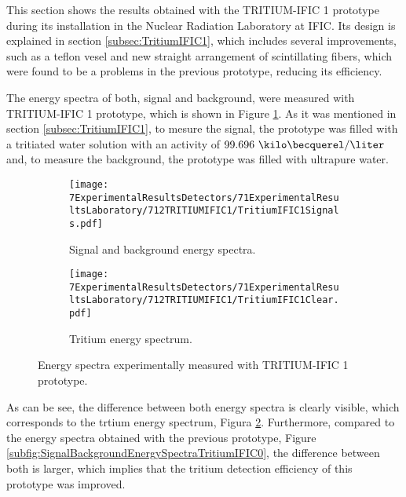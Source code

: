 This section shows the results obtained with the TRITIUM-IFIC 1 prototype  during its installation in the Nuclear Radiation Laboratory at IFIC. Its design is explained in section \ref{subsec:TritiumIFIC1}, which includes several improvements, such as a teflon vesel and new straight arrangement of scintillating fibers, which were found to be a problems in the previous prototype, reducing its efficiency.

The energy spectra of both, signal and background, were measured with TRITIUM-IFIC 1 prototype, which is shown in Figure \ref{subfig:SignalBackgroundEnergySpectraTritiumIFIC1}. As it was mentioned in section \ref{subsec:TritiumIFIC1}, to mesure the signal, the prototype was filled with a tritiated water solution with an activity of $99.696~\kilo\becquerel/\liter$ and, to measure the background, the prototype was filled with ultrapure water.

\begin{figure}
\centering
    \begin{subfigure}[b]{1\textwidth}
    \centering
    \texttt{[image: 7ExperimentalResultsDetectors/71ExperimentalResultsLaboratory/712TRITIUMIFIC1/TritiumIFIC1Signals.pdf]}  
    \caption{Signal and background energy spectra.\label{subfig:SignalBackgroundEnergySpectraTritiumIFIC1}}
    \end{subfigure}
    \hfill
    \begin{subfigure}[b]{1\textwidth}
    \centering
    \texttt{[image: 7ExperimentalResultsDetectors/71ExperimentalResultsLaboratory/712TRITIUMIFIC1/TritiumIFIC1Clear.pdf]}  
    \caption{Tritium energy spectrum.\label{subfig:TritiumEnergySpectraTritiumIFIC1}}
    \end{subfigure}
 \caption{Energy spectra experimentally measured with TRITIUM-IFIC 1 prototype.}
 \label{fig:EnergySpectraTRITIUMIFIC1}
\end{figure}


As can be see, the difference between both energy spectra is clearly visible, which corresponds to the trtium energy spectrum, Figura \ref{subfig:TritiumEnergySpectraTritiumIFIC1}. Furthermore, compared to the energy spectra obtained with the previous prototype, Figure \ref{subfig:SignalBackgroundEnergySpectraTritiumIFIC0}, the difference between both is larger, which implies that the tritium detection efficiency of this prototype was improved.

